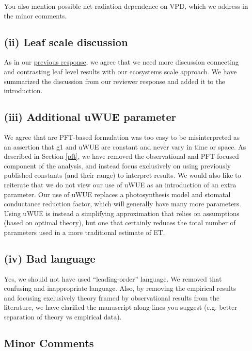 \documentclass[12pt]{article}
\begin{document}
\medskip

You also mention possible net radiation dependence on VPD, which we
address in the minor comments.

\subsection{(ii) Leaf scale discussion}
\label{leaf}
As in our
\href{https://www.hydrol-earth-syst-sci-discuss.net/hess-2018-553/hess-2018-553-AC2-supplement.pdf}{previous
  response}, we agree that we need more discussion connecting and
contrasting leaf level results with our ecosystems scale approach. We
have summarized the discussion from our reviewer response and added it
to the introduction.

\subsection{(iii) Additional uWUE parameter}

We agree that are PFT-based formulation was too easy to be
misinterpreted as an assertion that g1 and uWUE are constant and never
vary in time or space. As described in Section \ref{pft}, we have
removed the observational and PFT-focused component of the analysis,
and instead focus exclusively on using previously published constants
(and their range) to interpret results. We would also like to
reiterate that we do not view our use of uWUE as an introduction of an
extra parameter. Our use of uWUE replaces a photosynthesis model and
stomatal conductance reduction factor, which will generally have many
more parameters. Using uWUE is instead a simplifying approximation
that relies on assumptions (based on optimal theory), but one that
certainly reduces the total number of parameters used in a more
traditional estimate of ET.

\subsection{(iv) Bad language}

Yes, we should not have used ``leading-order'' language. We removed
that confusing and inappropriate language. Also, by removing the
empirical results and focusing exclusively theory framed by observational
results from the literature, we have clarified the manuscript along
lines you suggest (e.g. better separation of theory vs empirical
data).

\subsection{Minor Comments}
\end{document}
